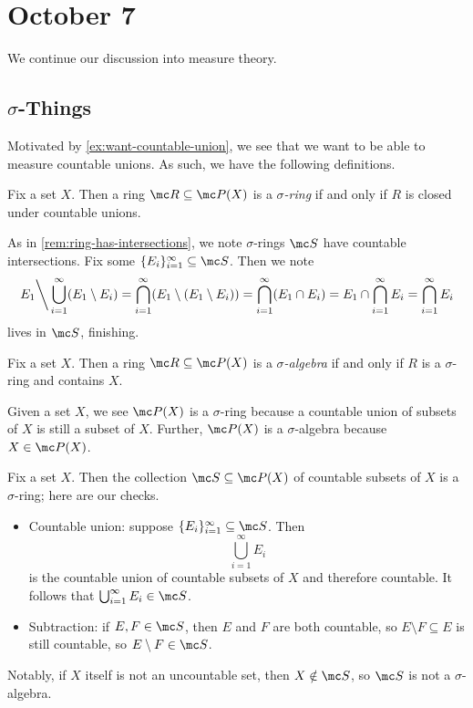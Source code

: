 \documentclass[../notes.tex]{subfiles}
\begin{document}
\section{October 7}

We continue our discussion into measure theory.

\subsection{\texorpdfstring{$\sigma$}{ Sigma}-Things}
Motivated by \autoref{ex:want-countable-union}, we see that we want to be able to measure countable unions. As such, we have the following definitions.
\begin{defihelper} 
	Fix a set $X$. Then a ring $\mc R\subseteq\mc P(X)$ is a \textit{$\sigma$-ring} if and only if $R$ is closed under countable unions.
\end{defihelper}
\begin{remark} \label{rem:sring-has-intersections}
	As in \autoref{rem:ring-has-intersections}, we note $\sigma$-rings $\mc S$ have countable intersections. Fix some $\{E_i\}_{i=1}^\infty\subseteq\mc S$. Then we note
	\[E_1{\mathbin\bigg\backslash}\bigcup_{i=1}^\infty(E_1\setminus E_i)=\bigcap_{i=1}^\infty(E_1\setminus(E_1\setminus E_i))=\bigcap_{i=1}^\infty(E_1\cap E_i)=E_1\cap\bigcap_{i=1}^\infty E_i=\bigcap_{i=1}^\infty E_i\]
	lives in $\mc S$, finishing.
\end{remark}
\begin{defihelper} 
	Fix a set $X$. Then a ring $\mc R\subseteq\mc P(X)$ is a \textit{$\sigma$-algebra} if and only if $R$ is a $\sigma$-ring and contains $X$.
\end{defihelper}
\begin{ex}
	Given a set $X$, we see $\mc P(X)$ is a $\sigma$-ring because a countable union of subsets of $X$ is still a subset of $X$. Further, $\mc P(X)$ is a $\sigma$-algebra because $X\in\mc P(X)$.
\end{ex}
\begin{example} \label{ex:countable-sigma-ring}
	Fix a set $X$. Then the collection $\mc S\subseteq\mc P(X)$ of countable subsets of $X$ is a $\sigma$-ring; here are our checks.
	\begin{itemize}
		\item Countable union: suppose $\{E_i\}_{i=1}^\infty\subseteq\mc S$. Then
		\[\bigcup_{i=1}^\infty E_i\]
		is the countable union of countable subsets of $X$ and therefore countable. It follows that $\bigcup_{i=1}^\infty E_i\in\mc S$.
		\item Subtraction: if $E,F\in\mc S$, then $E$ and $F$ are both countable, so $E\setminus F\subseteq E$ is still countable, so $E\setminus F\in\mc S$.
	\end{itemize}
	Notably, if $X$ itself is not an uncountable set, then $X\notin\mc S$, so $\mc S$ is not a $\sigma$-algebra.
\end{example}
\end{document}
